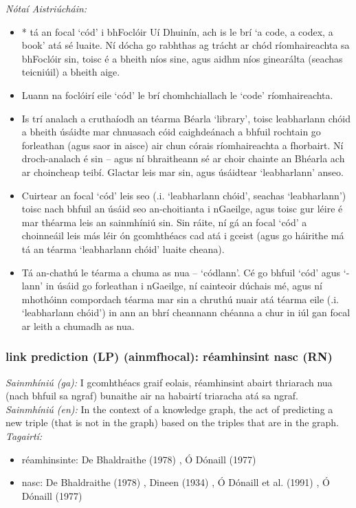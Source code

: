  \noindent \textit{Nótaí Aistriúcháin:}
\begin{itemize}
	\item * tá an focal `cód' i bhFoclóir Uí Dhuinín, ach is le brí `a code, a codex, a book' atá sé luaite. Ní dócha go rabhthas ag trácht ar chód ríomhaireachta sa bhFoclóir sin, toisc é a bheith níos sine, agus aidhm níos ginearálta (seachas teicniúil) a bheith aige.
	\item Luann na foclóirí eile `cód' le brí chomhchiallach le `code' ríomhaireachta.
	\item Is trí analach a cruthaíodh an téarma Béarla `library', toisc leabharlann chóid a bheith úsáidte mar chnuasach cóid caighdeánach a bhfuil rochtain go forleathan (agus saor in aisce) air chun córais ríomhaireachta a fhorbairt. Ní droch-analach é sin -- agus ní bhraitheann sé ar choir chainte an Bhéarla ach ar choincheap teibí. Glactar leis mar sin, agus úsáidtear `leabharlann' anseo.
	\item Cuirtear an focal `cód' leis seo (.i. `leabharlann chóid', seachas `leabharlann') toisc nach bhfuil an úsáid seo an-choitianta i nGaeilge, agus toisc gur léire é mar théarma leis an sainmhíniú sin. Sin ráite, ní gá an focal `cód' a choinneáil leis más léir ón gcomhthéacs cad atá i gceist (agus go háirithe má tá an téarma `leabharlann chóid' luaite cheana).
	\item Tá an-chathú le téarma a chuma as nua -- `códlann'. Cé go bhfuil `cód' agus `-lann' in úsáid go forleathan i nGaeilge, ní cainteoir dúchais mé, agus ní mhothóinn compordach téarma mar sin a chruthú nuair atá téarma eile (.i. `leabharlann chóid') in ann an bhrí cheannann chéanna a chur in iúl gan focal ar leith a chumadh as nua.
\end{itemize}


\subsubsection*{link prediction (LP) (ainmfhocal): réamhinsint nasc (RN)}
 \noindent \textit{Sainmhíniú (ga):} I gcomhthéacs graif eolais, réamhinsint abairt thriarach nua (nach bhfuil sa ngraf) bunaithe air na habairtí triaracha atá sa ngraf.
\\
 \noindent \textit{Sainmhíniú (en):} In the context of a knowledge graph, the act of predicting a new triple (that is not in the graph) based on the triples that are in the graph.
\\
 \noindent \textit{Tagairtí:}
\begin{itemize}
	\item réamhinsinte: De Bhaldraithe (1978) \cite{de-bhaldraithe}, Ó Dónaill (1977) \cite{odonaill}
	\item nasc: De Bhaldraithe (1978) \cite{de-bhaldraithe}, Dineen (1934) \cite{dineen}, Ó Dónaill et al. (1991) \cite{focloir-beag}, Ó Dónaill (1977) \cite{odonaill}
\end{itemize}

